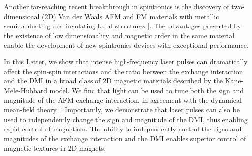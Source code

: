 \documentclass[aps,prl,twocolumn,amsmath,amssymb,nobibnotes]{revtex4-1}%
\renewcommand{\cite}[1]{{[}\onlinecite{#1}{]}}
\begin{document}
Another far-reaching recent breakthrough in spintronics is the discovery of two-dimensional (2D) Van der Waals AFM and FM materials with metallic, semiconducting and insulating band structures \cite{2D1,2D2}. The advantages presented by the existence of low dimensionality and magnetic order in the same material enable the development of new spintronics devices with exceptional performance.

In this Letter, we show that intense high-frequency laser pulses can dramatically affect the spin-spin interactions and the ratio between the exchange interaction and the DMI in a broad class of 2D magnetic materials described by the Kane-Mele-Hubbard model.  We find that light can be used to tune both the sign and magnitude of the AFM exchange interaction, in agreement with the dynamical mean-field theory \cite{Mentink2015}. Importantly, we demonstrate that laser pulses can also be used to independently change the sign and magnitude of the DMI, thus enabling rapid control of magnetism. The ability to independently control the signs and magnitudes of the exchange interaction and the DMI enables superior control of magnetic textures in 2D magnets.
\end{document}

